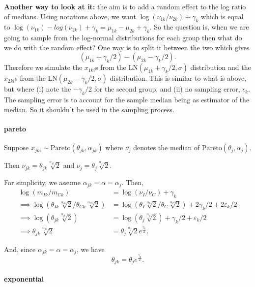 \documentclass[]{article}
\let\oldparagraph\paragraph
\renewcommand{\paragraph}[1]{\oldparagraph{#1}\mbox{}}
\begin{document}
\noindent \textbf{Another way to look at it:} the aim is to add a random
effect to the log ratio of medians. Using notations above, we want
\(\log(\nu_{1k}/\nu_{2k}) + \gamma_k\) which is equal to
\(\log(\nu_{1k}) - log(\nu_{2k}) + \gamma_k = \mu_{1k} - \mu_{2k} + \gamma_k\).
So the question is, when we are going to sample from the log-normal
distributions for each group then what do we do with the random effect?
One way is to split it between the two which gives
\[(\mu_{1k} + \gamma_k/2) - (\mu_{2k} - \gamma_k/2).\] Therefore we
simulate the \(x_{1ki}\)s from the LN\((\mu_{1k} + \gamma_k/2, \sigma)\)
distribution and the \(x_{2ki}\)s from the
LN\((\mu_{2k} - \gamma_k/2, \sigma)\) distribution. This is similar to
what is above, but where (i) note the \(-\gamma_k/2\) for the second
group, and (ii) no sampling error, \(\epsilon_k\). The sampling error is
to account for the sample median being as estimator of the median. So it
shouldn't be used in the sampling process.

\hypertarget{pareto}{%
\paragraph{pareto}\label{pareto}}

Suppose \(x_{jki} \sim \mathrm{Pareto}(\theta_{jk}, \alpha_{jk})\) where
\(\nu_j\) denotes the median of
\(\mathrm{Pareto}(\theta_{j}, \alpha_{j})\).

Then \(\nu_{jk} = \theta_{jk} \sqrt[\alpha_{jk}]2\) and
\(\nu_{j} = \theta_{j} \sqrt[\alpha_{j}]2\).

For simplicity, we assume \(\alpha_{jk} = \alpha = \alpha_j\). Then,
\begin{align*}
\log(m_{Ik}/m_{Ck}) &= \log(\nu_I/\nu_C) + \gamma_k \\
\implies \log(\theta_{Ik} \sqrt[\alpha_{Ik}]2/\theta_{Ck} \sqrt[\alpha_{Ck}]2) &= \log(\theta_{I} \sqrt[\alpha_{I}]2/\theta_{C} \sqrt[\alpha_{C}]2) + 2\gamma_k/2 + 2\varepsilon_k/2\\
\implies \log(\theta_{jk}\sqrt[\alpha_{jk}]2)  &= \log(\theta_{j} \sqrt[\alpha_{j}]2) + \gamma_k/2 + \varepsilon_k/2\\
\implies \theta_{jk}\sqrt[\alpha_{jk}]2 &= \theta_{j} \sqrt[\alpha_{j}]2 e^{\frac{\gamma_k}{2}}. 
\end{align*}

And, since \(\alpha_{jk} = \alpha = \alpha_j\), we have \[
\theta_{jk} = \theta_j e^{\frac{\gamma_k}{2}}.
\]

\hypertarget{exponential}{%
\paragraph{exponential}\label{exponential}}
\end{document}
